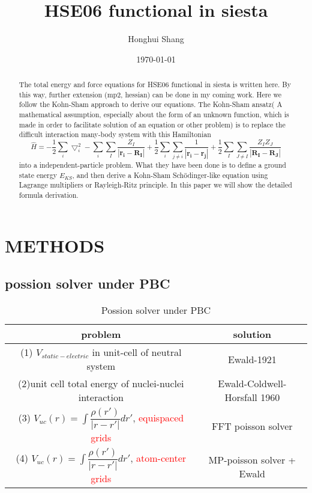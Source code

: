 \documentclass[aps,preprint,12pt]{revtex4-1}
\begin{document}
\title{HSE06 functional in siesta}
\author{ Honghui Shang}


\date{\today}

\begin{abstract}
The total energy and force equations for HSE06 functional in siesta is written here. By this way, further
 extension (mp2, hessian) can be done in my coming work. Here we follow the Kohn-Sham approach \cite{DFT_KS} to
derive our equations.  The Kohn-Sham ansatz( A mathematical assumption, especially about the form of an 
unknown function, which is made in order to facilitate solution of an equation or other problem) is to replace the difficult interaction many-body system with this Hamiltonian 
\begin{equation}
\hat{H}=-\dfrac{1}{2}\sum_{i}\bigtriangledown^2_{i}-\sum_{i}\sum_{I}\dfrac{Z_I}{|\mathbf{r_i}-\mathbf{R_I}|}
+\dfrac{1}{2}\sum_{i}\sum_{j\neq i}\dfrac{1}{|\mathbf{r_i}-\mathbf{r_j}|}
+\dfrac{1}{2}\sum_{I}\sum_{J\neq I}\dfrac{Z_I Z_J}{|\mathbf{R_I}-\mathbf{R_J}|}
\end{equation} into a independent-particle problem. What they have been done is to define a ground state
energy $E_{KS}$, and then derive a Kohn-Sham Sch\"{o}dinger-like equation using Lagrange multipliers or
Rayleigh-Ritz principle.  In this paper we will show the detailed formula derivation.

\end{abstract}
\maketitle


\section{METHODS}

\subsection{possion solver under PBC}
\begin{table}
\caption{Possion solver under PBC}
\begin{tabular}{c|c}
\hline \hline 
problem & solution \\
\hline 
(1) $V_{static-electric}$ in unit-cell of neutral system & Ewald-1921  \\
(2)unit cell total energy of nuclei-nuclei interaction & Ewald-Coldwell-Horsfall 1960\\
(3) $V_{uc}(r)=\int \dfrac{\rho(r')}{|r-r'|} dr'$, \textcolor{red}{equispaced grids} &  FFT poisson solver \\
(4)  $V_{uc}(r)=\int \dfrac{\rho(r')}{|r-r'|} dr'$, \textcolor{red}{atom-center grids} & MP-poisson solver + Ewald \\ 
\hline \hline
\end{tabular}
 
\end{table}
\end{document}
